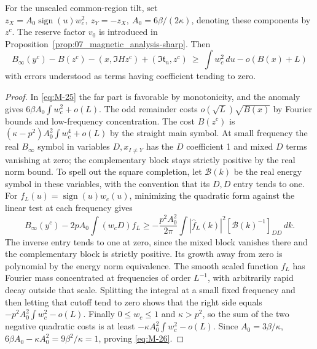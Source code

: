 \begin{lemma}\label{lem:07_magnetic_analysis-common}
For the unscaled common-region tilt, set \(z_X=A_0\operatorname{sign}(u)w_c^2,\ z_Y=-z_X,\ A_0=6\beta/(2\kappa)\), denoting these components by \(z^c\). The reserve factor \(v_0\) is introduced in Proposition~\ref{prop:07_magnetic_analysis-sharp}. Then
\begin{equation}
 B_\infty(y^c)-B(z^c)-(x,\Im H z^c)+(\Im\mathfrak t_n,z^c)
 \ \ge\ \int w_c^2\,du-o(B(x)+L)
 \label{eq:M-26}
\end{equation}
with errors understood as terms having coefficient tending to zero. 
\end{lemma}
\begin{proof}
In \eqref{eq:M-25} the far part is favorable by monotonicity, and the anomaly gives \(6\beta A_0\int w_c^2+o(L)\). The odd remainder costs \(o(\sqrt L)\sqrt{B(x)}\) by Fourier bounds and low-frequency concentration. The cost \(B(z^c)\) is \((\kappa-p^2)A_0^2\int w_c^4+o(L)\) by the straight main symbol. At small frequency the real \(B_\infty\) symbol in variables \(D,x_{I\ne Y}\) has the \(D\) coefficient 1 and mixed \(D\) terms vanishing at zero; the complementary block stays strictly positive by the real norm bound. To spell out the square completion, let \(\mathcal B(k)\) be the
real energy symbol in these variables, with the convention that its
\(D,D\) entry tends to one. For
\(f_L(u)=\operatorname{sign}(u)w_c(u)\), minimizing the quadratic
form against the linear test at each frequency gives
\[
 B_\infty(y^c)-2pA_0\int (w_cD)f_L
 \ge -\frac{p^2A_0^2}{2\pi}
     \int |\widehat f_L(k)|^2
                [\mathcal B(k)^{-1}]_{DD}\,dk.
\]
The inverse entry tends to one at zero, since the mixed block vanishes
there and the complementary block is strictly positive. Its growth
away from zero is polynomial by the energy norm equivalence. The
smooth scaled function \(f_L\) has Fourier mass concentrated at
frequencies of order \(L^{-1}\), with arbitrarily rapid decay outside
that scale. Splitting the integral at a small fixed frequency and then
letting that cutoff tend to zero shows that the right side equals
\(-p^2A_0^2\int w_c^2-o(L)\). Finally \(0\le w_c\le1\) and \(\kappa>p^2\), so the sum of the two negative quadratic costs is at least \(-\kappa A_0^2\int w_c^2-o(L)\). Since \(A_0=3\beta/\kappa\), \(6\beta A_0-\kappa A_0^2=9\beta^2/\kappa=1\), proving \eqref{eq:M-26}.


\end{proof}

